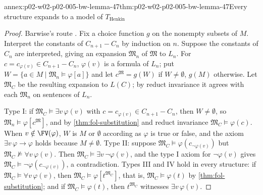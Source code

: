 \begin{annexitem}{annex:p02-w02-p02-005-bw-lemma-47}{thm:p02-w02-p02-005-bw-lemma-47}{Every structure expands to a model of \(T_{\mathrm{Henkin}}\)}
\begin{proof}
Barwise's route \cite[ch.~A.1, \S4, pp.~30--31]{Barwise1977FirstOrder}.
Fix a choice function \(g\) on the nonempty subsets of \(M\).  Interpret
the constants of \(C_{n+1}-C_n\) by induction on \(n\).  Suppose the
constants of \(C_n\) are interpreted, giving an expansion \(\mathfrak M_n\)
of \(\mathfrak M\) to \(L_n\).  For \(c=c_{\varphi(v)}\in C_{n+1}-C_n\),
\(\varphi(v)\) is a formula of \(L_n\); put
\(W=\{a\in M\mid\mathfrak M_n\models\varphi[a]\}\) and let
\(c^{\mathfrak M}=g(W)\) if \(W\neq\emptyset\), \(g(M)\) otherwise.  Let
\(\mathfrak M_C\) be the resulting expansion to \(L(C)\); by reduct
invariance it agrees with each \(\mathfrak M_n\) on sentences of \(L_n\).

Type I: if \(\mathfrak M_C\models\exists v\,\varphi(v)\) with
\(c=c_{\varphi(v)}\in C_{n+1}-C_n\), then \(W\neq\emptyset\), so
\(\mathfrak M_n\models\varphi[c^{\mathfrak M}]\), and by
\cref{thm:fol-substitution} and reduct invariance
\(\mathfrak M_C\models\varphi(c)\).  When \(v\notin\FV(\varphi)\), \(W\) is
\(M\) or \(\emptyset\) according as \(\varphi\) is true or false, and the
axiom \(\exists v\,\varphi\to\varphi\) holds because \(M\neq\emptyset\).
Type II: suppose \(\mathfrak M_C\models\varphi(c_{\neg\varphi(v)})\) but
\(\mathfrak M_C\not\models\forall v\,\varphi(v)\).  Then
\(\mathfrak M_C\models\exists v\,\neg\varphi(v)\), and the type I axiom for
\(\neg\varphi(v)\) gives \(\mathfrak M_C\models\neg\varphi(c_{\neg\varphi(v)})\),
a contradiction.  Types III and IV hold in every structure: if
\(\mathfrak M_C\models\forall v\,\varphi(v)\), then
\(\mathfrak M_C\models\varphi[t^{\mathfrak M_C}]\), that is,
\(\mathfrak M_C\models\varphi(t)\) by \cref{thm:fol-substitution}; and if
\(\mathfrak M_C\models\varphi(t)\), then \(t^{\mathfrak M_C}\) witnesses
\(\exists v\,\varphi(v)\).
\end{proof}
\end{annexitem}

